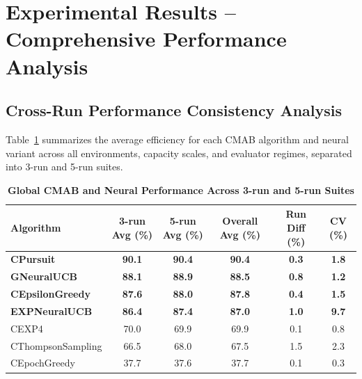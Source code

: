 \documentclass[12pt,a4paper]{article}
\newcommand{\performance}[1]{\textcolor{performancecolor}{\textbf{#1}}}
\newcommand{\legacy}[1]{\textcolor{legacycolor}{\textbf{#1}}}
\newcommand{\neural}[1]{\textcolor{neuralcolor}{\textbf{#1}}}
\begin{document}
\section{Experimental Results – Comprehensive Performance Analysis}

\begin{tcolorbox}[colback=performancecolor!10,colframe=performancecolor,title=\textbf{Primary Performance Results (Aggregated Across Capacities, Environments, and Regimes)}]
\small
\subsection{Cross-Run Performance Consistency Analysis}

Table~\ref{tab:global-performance} summarizes the average efficiency for each CMAB algorithm and neural variant across all environments, capacity scales, and evaluator regimes, separated into 3-run and 5-run suites.

\begin{table}[H]
\small
\centering
\caption{\performance{Global CMAB and Neural Performance Across 3-run and 5-run Suites}}
\label{tab:global-performance}
\begin{tabular}{|l|c|c|c|c|c|}
\hline
\textbf{Algorithm} & \textbf{3-run Avg (\%)} & \textbf{5-run Avg (\%)} & \textbf{Overall Avg (\%)} & \textbf{Run Diff (\%)} & \textbf{CV (\%)} \\
\hline
\hline
\performance{CPursuit}        & \performance{90.1} & \performance{90.4} & \performance{90.4} & \performance{0.3} & \performance{1.8} \\
\neural{GNeuralUCB}          & \neural{88.1} & \neural{88.9} & \neural{88.5} & \neural{0.8} & \neural{1.2} \\
\performance{CEpsilonGreedy} & \performance{87.6} & \performance{88.0} & \performance{87.8} & \performance{0.4} & \performance{1.5} \\
\legacy{EXPNeuralUCB}        & \legacy{86.4}     & \legacy{87.4}     & \legacy{87.0} & \legacy{1.0} & \legacy{9.7} \\
CEXP4                        & 70.0              & 69.9              & 69.9 & 0.1 & 0.8 \\
CThompsonSampling            & 66.5              & 68.0              & 67.5 & 1.5 & 2.3 \\
CEpochGreedy                 & 37.7              & 37.6              & 37.7 & 0.1 & 0.3 \\
\hline
\end{tabular}
\end{table}


\end{tcolorbox}
\end{document}
